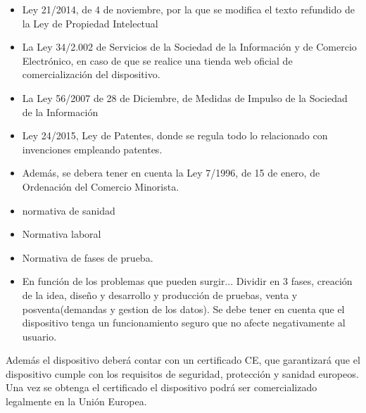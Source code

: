 \begin{itemize}
    \item Ley 21/2014, de 4 de noviembre, por la que se modifica el texto refundido de la Ley de Propiedad Intelectual 

    \item La Ley 34/2.002 de Servicios de la Sociedad de la Información y de Comercio Electrónico, en caso de que se realice una tienda web oficial de comercialización del dispositivo.
    \item La Ley 56/2007 de 28 de Diciembre, de Medidas de Impulso de la Sociedad de la Información 

    \item Ley 24/2015, Ley de Patentes, donde se regula todo lo relacionado con invenciones empleando patentes.
    
    \item Además, se debera tener en cuenta la Ley 7/1996, de 15 de enero, de Ordenación del Comercio Minorista.
    
    \item normativa de sanidad
    
    \item Normativa laboral
    \item Normativa de fases de prueba.
    \item En función de los problemas que pueden surgir... Dividir en 3 fases, creación de la idea, diseño y desarrollo y producción de pruebas, venta y posventa(demandas y gestion de los datos). Se debe tener en cuenta que el dispositivo tenga un funcionamiento seguro que no afecte negativamente al usuario.
    
\end{itemize}

Además el dispositivo deberá contar con un certificado CE, que garantizará que el dispositivo cumple con los requisitos de seguridad, protección y sanidad europeos. Una vez se obtenga el certificado el dispositivo podrá ser comercializado legalmente en la Unión Europea.
